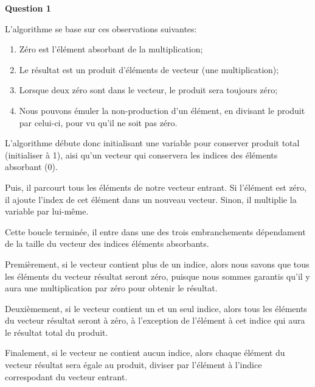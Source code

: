 \documentclass[class=article]{standalone}
\begin{document}
\centerline{\Huge \bf Question 1}
\bigskip
{}

L'algorithme se base sur ces observations suivantes:
\begin{enumerate}
    \item Zéro est l'élément absorbant de la multiplication;
    \item Le résultat est un produit d'éléments de vecteur (une multiplication);
    \item Lorsque deux zéro sont dans le vecteur, le produit sera toujours zéro;
    \item Nous pouvons émuler la non-production d'un élément, en divisant le produit par celui-ci, pour vu qu'il ne soit pas zéro.
\end{enumerate}

L'algorithme débute donc initialisant une variable pour conserver produit total (initialiser à 1), 
aisi qu'un vecteur qui conservera les indices des éléments absorbant (0).

Puis, il parcourt tous les éléments de notre vecteur entrant. Si l'élément est zéro, il ajoute l'index
de cet élément dans un nouveau vecteur. Sinon, il multiplie la variable par lui-même.

Cette boucle terminée, il entre dans une des trois embranchements dépendament de la taille du vecteur des indices éléments absorbants.

Premièrement, si le vecteur contient plus de un indice, alors nous savons que tous les éléments du vecteur résultat seront zéro, 
puisque nous sommes garantis qu'il y aura une multiplication par zéro pour obtenir le résultat.

Deuxièmement, si le vecteur contient un et un seul indice, alors tous les éléments du vecteur résultat seront
à zéro, à l'exception de l'élément à cet indice qui aura le résultat total du produit.

Finalement, si le vecteur ne contient aucun indice, alors chaque élément du vecteur résultat sera égale au produit, diviser par 
l'élément à l'indice correspodant du vecteur entrant.
\end{document}
